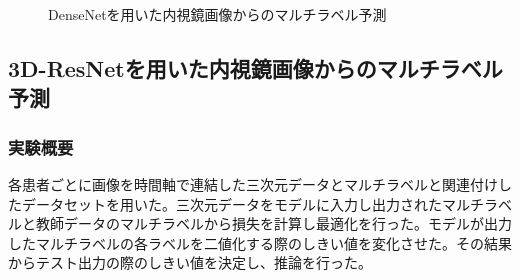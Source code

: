 \begin{figure}[tb]
    \centering
         \quad
         \quad
    \captionsetup{format=plain,font=normalsize,margin=30pt,name=図}
    \caption[]{DenseNetを用いた内視鏡画像からのマルチラベル予測}
    \label{fig:result0}
\end{figure}

\subsection{3D-ResNetを用いた内視鏡画像からのマルチラベル予測}
\subsubsection{実験概要}
各患者ごとに画像を時間軸で連結した三次元データとマルチラベルと関連付けしたデータセットを用いた。三次元データをモデルに入力し出力されたマルチラベルと教師データのマルチラベルから損失を計算し最適化を行った。モデルが出力したマルチラベルの各ラベルを二値化する際のしきい値を変化させた。その結果からテスト出力の際のしきい値を決定し、推論を行った。

